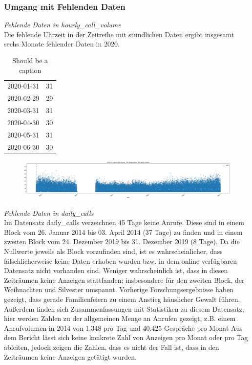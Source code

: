 \documentclass[12pt]{report}
\begin{document}
	\subsubsection{Umgang mit Fehlenden Daten}
	\textit{Fehlende Daten in hourly\_call\_volume}\\	
	Die fehlende Uhrzeit in der Zeitreihe mit stündlichen Daten ergibt insgesamt sechs Monate fehlender Daten in 2020. \\
	\begin {table} [ht]%
	\label{tab:fehlende-tage} 
	\centering
	\begin{tabular}{|l|l|}
		\hline
		2020-01-31  & 31\\
		2020-02-29  & 29\\
		2020-03-31  & 31\\
		2020-04-30  & 30\\
		2020-05-31  & 31\\
		2020-06-30  & 30\\
		\hline
	\end{tabular}
	\caption {Should be a caption} %
	\end {table}
	\begin{figure}
		\centering
		\includegraphics[width=1\linewidth]{screenshot003}
		\caption{}
		\label{fig:screenshot003}
	\end{figure}
	\textit{Fehlende Daten in daily\_calls}\\
	Im Datensatz daily\_calls verzeichnen 45 Tage keine Anrufe. Diese sind in einem Block vom 26. Januar 2014 bis 03. April 2014 (37 Tage) zu finden und in einem zweiten Block vom 24. Dezember 2019 bis 31. Dezember 2019 (8 Tage). Da die Nullwerte jeweils als Block vorzufinden sind, ist es wahrscheinlicher, dass fälschlicherweise keine Daten erhoben wurden bzw. in dem online verfügbaren Datensatz nicht vorhanden sind. Weniger wahrscheinlich ist, dass in diesen Zeiträumen keine Anzeigen stattfanden; insbesondere für den zweiten Block, der Weihnachten und Silvester umspannt. Vorherige Forschungsergebnisse %
	haben gezeigt, dass gerade Familienfeiern zu einem Anstieg häuslicher Gewalt führen. Außerdem finden sich Zusammenfassungen mit Statistiken zu diesem Datensatz, hier werden Zahlen zu der allgemeinen Menge an Anrufen gezeigt, z.B. einem Anrufvolumen in 2014 von 1.348 pro Tag und 40.425 Gespräche pro Monat \cite[S. 5]{BalancoLigue180.2015}Aus dem Bericht lässt sich keine konkrete Zahl von Anzeigen pro Monat oder pro Tag ableiten, jedoch zeigen die Zahlen, dass es nicht der Fall ist, dass in den Zeiträumen keine Anzeigen getätigt wurden\cite{BalancoLigue180.2015, BalancoLigue180.2020}. \\
\end{document}
